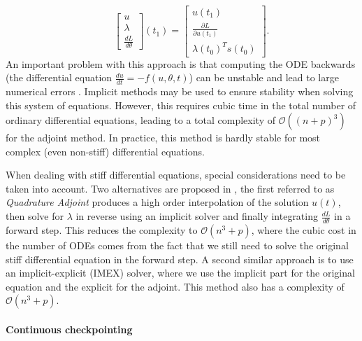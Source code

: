\begin{enumerate}[label=(\roman*)]
\begin{equation}
    \qquad 
    \begin{bmatrix}
       u \\
       \lambda \\
       \frac{dL}{d\theta}
    \end{bmatrix}(t_1)
    = 
    \begin{bmatrix}
       u(t_1) \\
       \frac{\partial L}{\partial u(t_1)} \\
       \lambda(t_0)^T s(t_0)
    \end{bmatrix}.
    \end{equation}
    An important problem with this approach is that computing the ODE backwards (the differential equation $\frac{du}{dt} = - f(u,\theta, t)$) can be unstable and lead to large numerical errors \cite{kim_stiff_2021, Zhuang_2020}. 
    Implicit methods may be used to ensure stability when solving this system of equations. 
    However, this requires cubic time in the total number of ordinary differential equations, leading to a total complexity of $\mathcal O((n+p)^3)$ for the adjoint method. In practice, this method is hardly stable for most complex (even non-stiff) differential equations. 
\end{enumerate} 

When dealing with stiff differential equations, special considerations need to be taken into account.
Two alternatives are proposed in \cite{kim_stiff_2021}, the first referred to as \textit{Quadrature Adjoint} produces a high order interpolation of the solution $u(t)$, then solve for $\lambda$ in reverse using an implicit solver and finally integrating $\frac{dL}{d\theta}$ in a forward step.
This reduces the complexity to $\mathcal O (n^3 + p)$, where the cubic cost in the number of ODEs comes from the fact that we still need to solve the original stiff differential equation in the forward step. 
A second similar approach is to use an implicit-explicit (IMEX) solver, where we use the implicit part for the original equation and the explicit for the adjoint. 
This method also has a complexity of $\mathcal O (n^3 + p)$. 

\paragraph{Continuous checkpointing}


